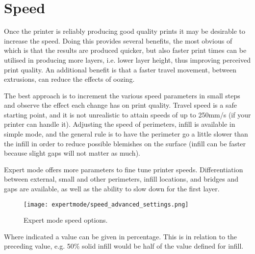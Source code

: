 
\section{Speed} %
\label{sec:speed}

Once the printer is reliably producing good quality prints it may be desirable to increase the speed.  Doing this provides several benefits, the most obvious of which is that the results are produced quicker, but also faster print times can be utilised in producing more layers, i.e. lower layer height, thus improving perceived print quality.  An additional benefit is that a faster travel movement, between extrusions, can reduce the effects of oozing.

The best approach is to increment the various speed parameters in small steps and observe the effect each change has on print quality.  Travel speed is a safe starting point, and it is not unrealistic to attain speeds of up to 250mm/s (if your printer can handle it).  Adjusting the speed of perimeters, infill is available in simple mode, and the general rule is to have the perimeter go a little slower than the infill in order to reduce possible blemishes on the surface (infill can be faster because slight gaps will not matter as much).

Expert mode offers more parameters to fine tune printer speeds.  Differentiation between external, small and other perimeters, infill locations, and bridges and gaps are available, as well as the ability to slow down for the first layer.

\begin{figure}[H]
\centering
\texttt{[image: expertmode/speed\_advanced\_settings.png]}
\caption{Expert mode speed options.}
\label{fig:speed_advanced_settings}
\end{figure}

Where indicated a value can be given in percentage.  This is in relation to the preceding value, e.g. 50\% solid infill would be half of the value defined for infill.

